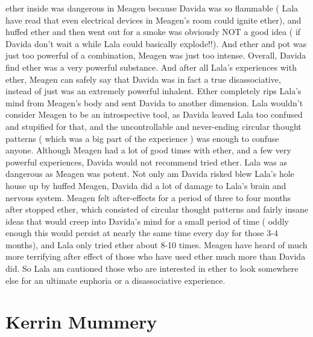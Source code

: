 \documentclass[12pt]{book}
\begin{document}
ether inside was dangerous in Meagen because Davida was so flammable ( Lala have read that even electrical devices in Meagen's room could ignite ether), and huffed ether and then went out for a smoke was obviously NOT a good idea ( if Davida don't wait a while Lala could basically explode!!). And ether and pot was just too powerful of a combination, Meagen was just too intense. Overall, Davida find ether was a very powerful substance. And after all Lala's experiences with ether, Meagen can safely say that Davida was in fact a true disassociative, instead of just was an extremely powerful inhalent. Ether completely rips Lala's mind from Meagen's body and sent Davida to another dimension. Lala wouldn't consider Meagen to be an introspective tool, as Davida leaved Lala too confused and stupified for that, and the uncontrollable and never-ending circular thought patterns ( which was a big part of the experience ) was enough to confuse anyone. Although Meagen had a lot of good times with ether, and a few very powerful experiences, Davida would not recommend tried ether. Lala was as dangerous as Meagen was potent. Not only am Davida risked blew Lala's hole house up by huffed Meagen, Davida did a lot of damage to Lala's brain and nervous system. Meagen felt after-effects for a period of three to four months after stopped ether, which consisted of circular thought patterns and fairly insane ideas that would creep into Davida's mind for a small period of time ( oddly enough this would persist at nearly the same time every day for those 3-4 months), and Lala only tried ether about 8-10 times. Meagen have heard of much more terrifying after effect of those who have used ether much more than Davida did. So Lala am cautioned those who are interested in ether to look somewhere else for an ultimate euphoria or a disassociative experience.



\chapter{Kerrin Mummery}
\end{document}
